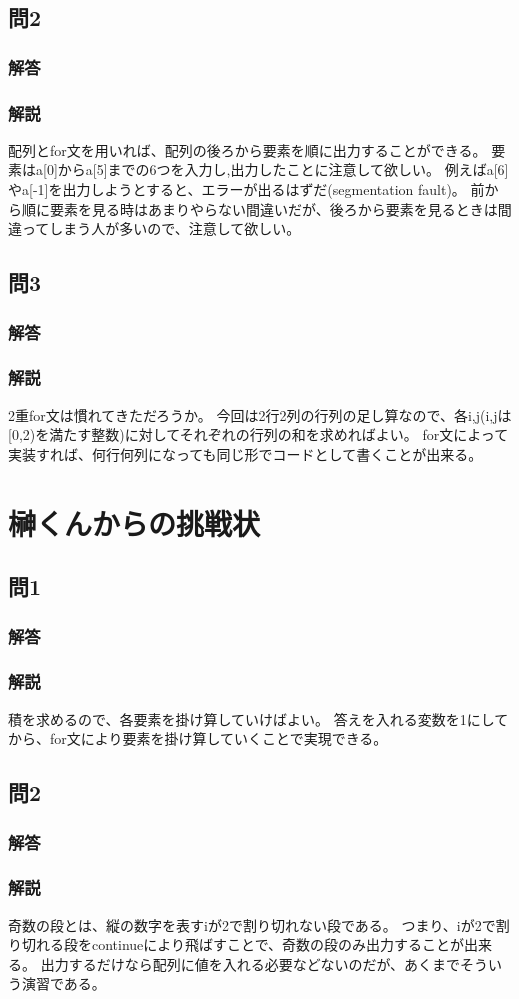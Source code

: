 
\subsection{問2}
\subsubsection{解答}

\subsubsection{解説}
配列とfor文を用いれば、配列の後ろから要素を順に出力することができる。
要素はa[0]からa[5]までの6つを入力し,出力したことに注意して欲しい。
例えばa[6]やa[-1]を出力しようとすると、エラーが出るはずだ(segmentation fault)。
前から順に要素を見る時はあまりやらない間違いだが、後ろから要素を見るときは間違ってしまう人が多いので、注意して欲しい。

\subsection{問3}
\subsubsection{解答}

\subsubsection{解説}
2重for文は慣れてきただろうか。
今回は2行2列の行列の足し算なので、各i,j(i,jは[0,2)を満たす整数)に対してそれぞれの行列の和を求めればよい。
for文によって実装すれば、何行何列になっても同じ形でコードとして書くことが出来る。

\section{榊くんからの挑戦状}
\subsection{問1}
\subsubsection{解答}

\subsubsection{解説}
積を求めるので、各要素を掛け算していけばよい。
答えを入れる変数を1にしてから、for文により要素を掛け算していくことで実現できる。


\subsection{問2}
\subsubsection{解答}

\subsubsection{解説}
奇数の段とは、縦の数字を表すiが2で割り切れない段である。
つまり、iが2で割り切れる段をcontinueにより飛ばすことで、奇数の段のみ出力することが出来る。
出力するだけなら配列に値を入れる必要などないのだが、あくまでそういう演習である。


